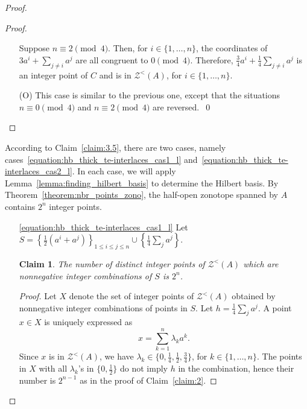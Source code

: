 \documentclass[11pt,a4paper]{amsart}
\renewcommand*{\leq}{\leqslant}
\theoremstyle{plain}
\newtheorem{claimnumb}{Claim}[theorem]{\itshape}{\rmfamily}
\theoremstyle{definition}
\newcommand{\cal}[1]{\mathcal{#1}}
\renewcommand{\cal}[1]{\mathcal{#1}}
\begin{document}
\begin{proof}
\begin{proof}
\begin{itemize}
	\noindent Suppose $n\equiv 2\pmod{4}$.
	Then, for $i\in\{1,\ldots,n\}$, the coordinates of $3a^i +\sum_{j\neq i}a^j$ are all congruent to $0\pmod{4}$.
	Therefore, $\frac{3}{4}a^i + \frac{1}{4}\sum_{j\neq i} a^j$ is an integer point of $C$ and is in $\cal{Z}^<(A)$, for $i\in\{1,\ldots,n\}$.
	\item[(O)] This case is similar to the previous one, except that the situations $n \equiv 0 \pmod{4}$ and $n \equiv 2 \pmod{4}$ are reversed.~\qed						
\end{itemize}
\end{proof}

According to Claim~\ref{claim:3.5}, there are two cases, namely cases~\ref{equation:hb_thick_te-interlaces_cas1_l} and~\ref{equation:hb_thick_te-interlaces_cas2_l}.
In each case, we will apply Lemma~\ref{lemma:finding_hilbert_basis} to determine the Hilbert basis. 
By Theorem~\ref{theorem:nbr_points_zono}, the half-open zonotope spanned by $A$ contains $2^n$ integer points.

\begin{itemize}
\item[\ref{equation:hb_thick_te-interlaces_cas1_l}]
Let $S=\left\{\frac{1}{2} (a^i + a^j)\right\}_{1\leq i\leq j\leq n}\cup\left\{\frac{1}{4}\sum_{j} a^j\right\}$.
\begin{claimnumb}\label{claim:4}
	The number of distinct integer points of $\cal Z^<(A)$ which are nonnegative integer combinations of $S$ is $2^n$.
\end{claimnumb}
\begin{proof}
	Let $X$ denote the set of integer points of $\cal Z^<(A)$ obtained by nonnegative integer combinations of points in $S$.
	Let $h=\frac{1}{4}\sum_{j} a^j$. A point $x\in X$ is uniquely expressed as
	$$x = \sum_{k=1}^n \lambda_k a^k.$$
	Since $x$ is in $\cal Z^<(A)$, we have $\lambda_k\in\{0,\frac{1}{4},\frac{1}{2},\frac{3}{4}\}$, for $k\in\{1,\ldots,n\}$.
	The points in $X$ with all $\lambda_k$'s in $\{0,\frac{1}{2}\}$ do not imply $h$ in the combination, hence their number is $2^{n-1}$ as in the proof of Claim~\ref{claim:2}.
	

\end{proof}
\end{itemize}
\end{proof}
\end{document}
